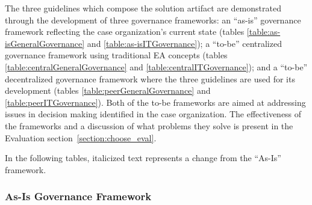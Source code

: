 The three guidelines which compose the solution artifact are demonstrated through the development of three governance frameworks: an ``as-is'' governance framework reflecting the case organization's current state (tables \ref{table:as-isGeneralGovernance} and \ref{table:as-isITGovernance}); a ``to-be'' centralized governance framework using traditional EA concepts (tables \ref{table:centralGeneralGovernance} and \ref{table:centralITGovernance}); and a ``to-be'' decentralized governance framework where the three guidelines are used for its development (tables \ref{table:peerGeneralGovernance} and \ref{table:peerITGovernance}). Both of the to-be frameworks are aimed at addressing issues in decision making identified in the case organization. The effectiveness of the frameworks and a discussion of what problems they solve is present in the Evaluation section~\ref{section:choose_eval}. 

In the following tables, italicized text represents a change from the ``As-Is'' framework. 

\subsubsection*{As-Is Governance Framework}

